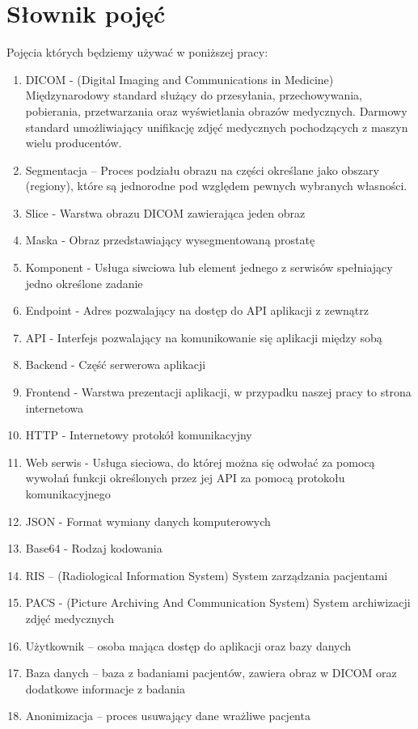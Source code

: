\documentclass[a4paper,11pt,twoside]{report}
\theoremstyle{definition}
\begin{document}
\section{Słownik pojęć}
Pojęcia których będziemy używać w poniższej pracy:
\begin {enumerate}
\item DICOM - (Digital Imaging and Communications in Medicine) Międzynarodowy standard służący do przesyłania, przechowywania, pobierania, przetwarzania oraz wyświetlania obrazów medycznych. Darmowy standard umożliwiający unifikację zdjęć medycznych pochodzących z maszyn wielu producentów.
\item Segmentacja – Proces podziału obrazu na części określane jako obszary (regiony), które są jednorodne pod względem pewnych wybranych własności.
\item Slice - Warstwa obrazu DICOM zawierająca jeden obraz
\item Maska - Obraz przedstawiający wysegmentowaną prostatę
\item Komponent - Usługa siwciowa lub element jednego z serwisów spełniający jedno określone zadanie
\item Endpoint - Adres pozwalający na dostęp do API aplikacji z zewnątrz
\item API - Interfejs pozwalający na komunikowanie się aplikacji między sobą 
\item Backend - Część serwerowa aplikacji 
\item Frontend - Warstwa prezentacji aplikacji, w przypadku naszej pracy to strona internetowa
\item HTTP - Internetowy protokół komunikacyjny
\item Web serwis - Usługa sieciowa, do której można się odwołać za pomocą wywołań funkcji określonych przez jej API za pomocą protokołu komunikacyjnego
\item JSON - Format wymiany danych komputerowych
\item Base64 - Rodzaj kodowania 
\item RIS – (Radiological Information System) System zarządzania pacjentami 
\item PACS - (Picture Archiving And Communication System) System archiwizacji zdjęć medycznych
\item Użytkownik – osoba mająca dostęp do aplikacji oraz bazy danych
\item Baza danych – baza z badaniami pacjentów, zawiera obraz w DICOM oraz dodatkowe informacje z badania
\item Anonimizacja – proces usuwający dane wrażliwe pacjenta
\end {enumerate}
\end{document}
